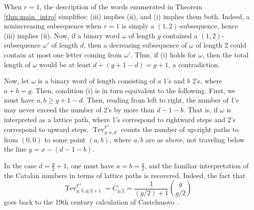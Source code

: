 \documentclass[12pt]{amsart}
\def\bP{\mathbb{P}}
\DeclareMathOperator{\Tev}{Tev}
\begin{document}
When $r=1$, the description of the words enumerated in Theorem \ref{thm:main_intro} simplifies: (iii) implies (ii), and (i) implies them both. Indeed, a nonincreasing subsequence when $r=1$ is simply a $(1,2)$-subsequence, hence (iii) implies (ii). Now, if a binary word $\omega$ of length $g$ contained a $(1,2)$-subsequence $\omega'$ of length $d$, then a decreasing subsequence of $\omega$ of length 2 could contain at most one letter coming from $\omega'$. Thus, if (i) holds for $\omega$, then the total length of $\omega$ would be at least $d+(g+1-d)=g+1$, a contradiction.

Now, let $\omega$ is a binary word of length consisting of $a$ 1's and $b$ 2's, where $a+b=g$. Then, condition (i) is in turn equivalent to the following. First, we must have $a,b\ge g+1-d$. Then, reading from left to right, the number of 1's may never exceed the number of 2's by more than $d-1-b$. That is, if $\omega$ is interpreted as a lattice path, where 1's correspond to rightward steps and 2's correspond to upward steps, $\Tev^{\bP^1}_{g,n,d}$ counts the number of up-right paths to from $(0,0)$ to some point $(a,b)$, where $a,b$ are as above, not traveling below the line $y=x-(d-1-b)$.

In the case $d=\frac{g}{2}+1$, one must have $a=b=\frac{g}{2}$, and the familiar interpretation of the Catalan numbers in terms of lattice paths is recovered. Indeed, the fact that 
\begin{equation*}
    \Tev^{\bP^1}_{g,3,g/2+1}=C_{g/2}=\frac{1}{(g/2)+1}\binom{g}{g/2}
\end{equation*}
goes back to the 19th century calculation of Castelnuovo \cite{castelnuovo}.

 

\end{document}

